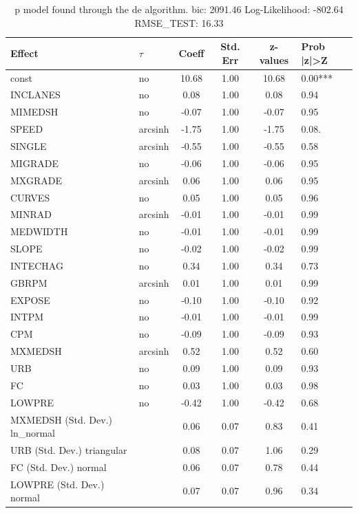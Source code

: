 \begin{table}
	\caption{p model found through the de algorithm. bic: 2091.46 Log-Likelihood: -802.64 RMSE_TEST: 16.33}
	\begin{center}
		\begin{tabular}{|l|l|c|c|c|l|}
			\hline
			Effect & $\tau$ & Coeff & Std. Err & z-values & Prob |z|>Z \\
			\hline
			const & no & 10.68 & 1.00 & 10.68 & 0.00*** \\
			\hline
			INCLANES & no & 0.08 & 1.00 & 0.08 & 0.94 \\
			\hline
			MIMEDSH & no & -0.07 & 1.00 & -0.07 & 0.95 \\
			\hline
			SPEED & arcsinh & -1.75 & 1.00 & -1.75 & 0.08. \\
			\hline
			SINGLE & arcsinh & -0.55 & 1.00 & -0.55 & 0.58 \\
			\hline
			MIGRADE & no & -0.06 & 1.00 & -0.06 & 0.95 \\
			\hline
			MXGRADE & arcsinh & 0.06 & 1.00 & 0.06 & 0.95 \\
			\hline
			CURVES & no & 0.05 & 1.00 & 0.05 & 0.96 \\
			\hline
			MINRAD & arcsinh & -0.01 & 1.00 & -0.01 & 0.99 \\
			\hline
			MEDWIDTH & no & -0.01 & 1.00 & -0.01 & 0.99 \\
			\hline
			SLOPE & no & -0.02 & 1.00 & -0.02 & 0.99 \\
			\hline
			INTECHAG & no & 0.34 & 1.00 & 0.34 & 0.73 \\
			\hline
			GBRPM & arcsinh & 0.01 & 1.00 & 0.01 & 0.99 \\
			\hline
			EXPOSE & no & -0.10 & 1.00 & -0.10 & 0.92 \\
			\hline
			INTPM & no & -0.01 & 1.00 & -0.01 & 0.99 \\
			\hline
			CPM & no & -0.09 & 1.00 & -0.09 & 0.93 \\
			\hline
			MXMEDSH & arcsinh & 0.52 & 1.00 & 0.52 & 0.60 \\
			\hline
			URB & no & 0.09 & 1.00 & 0.09 & 0.93 \\
			\hline
			FC & no & 0.03 & 1.00 & 0.03 & 0.98 \\
			\hline
			LOWPRE & no & -0.42 & 1.00 & -0.42 & 0.68 \\
			\hline
			MXMEDSH (Std. Dev.) ln_normal &  & 0.06 & 0.07 & 0.83 & 0.41 \\
			\hline
			URB (Std. Dev.) triangular &  & 0.08 & 0.07 & 1.06 & 0.29 \\
			\hline
			FC (Std. Dev.) normal &  & 0.06 & 0.07 & 0.78 & 0.44 \\
			\hline
			LOWPRE (Std. Dev.) normal &  & 0.07 & 0.07 & 0.96 & 0.34 \\
			\hline
		\end{tabular}
	\end{center}
\end{table}